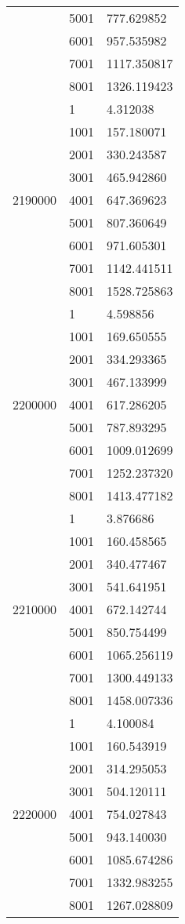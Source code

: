 \begin{table}[htb!]
\begin{tabular}{lll}
 & 5001 & 777.629852 \\
 & 6001 & 957.535982 \\
 & 7001 & 1117.350817 \\
 & 8001 & 1326.119423 \\
\multirow[c]{9}{*}{2190000} & 1 & 4.312038 \\
 & 1001 & 157.180071 \\
 & 2001 & 330.243587 \\
 & 3001 & 465.942860 \\
 & 4001 & 647.369623 \\
 & 5001 & 807.360649 \\
 & 6001 & 971.605301 \\
 & 7001 & 1142.441511 \\
 & 8001 & 1528.725863 \\
\multirow[c]{9}{*}{2200000} & 1 & 4.598856 \\
 & 1001 & 169.650555 \\
 & 2001 & 334.293365 \\
 & 3001 & 467.133999 \\
 & 4001 & 617.286205 \\
 & 5001 & 787.893295 \\
 & 6001 & 1009.012699 \\
 & 7001 & 1252.237320 \\
 & 8001 & 1413.477182 \\
\multirow[c]{9}{*}{2210000} & 1 & 3.876686 \\
 & 1001 & 160.458565 \\
 & 2001 & 340.477467 \\
 & 3001 & 541.641951 \\
 & 4001 & 672.142744 \\
 & 5001 & 850.754499 \\
 & 6001 & 1065.256119 \\
 & 7001 & 1300.449133 \\
 & 8001 & 1458.007336 \\
\multirow[c]{9}{*}{2220000} & 1 & 4.100084 \\
 & 1001 & 160.543919 \\
 & 2001 & 314.295053 \\
 & 3001 & 504.120111 \\
 & 4001 & 754.027843 \\
 & 5001 & 943.140030 \\
 & 6001 & 1085.674286 \\
 & 7001 & 1332.983255 \\
 & 8001 & 1267.028809 \\

\end{tabular}
\end{table}
